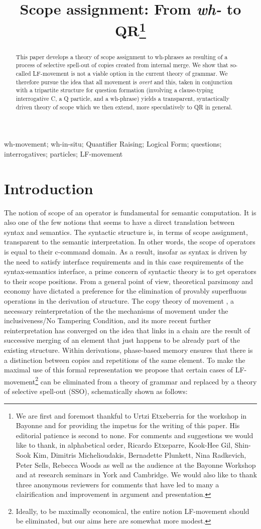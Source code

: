 \documentclass[charis]{glossa}
\title[Scope assignment]{Scope assignment: From \textit{wh-} to QR\thanks{We are first and foremost thankful to Urtzi Etxeberria for the workshop in Bayonne and for providing the impetus for the writing of this paper.  His editorial patience is second to none. For comments and suggestions we would like to thank, in alphabetical order, Ricardo Etxeparre, Kook-Hee Gil, Shin-Sook Kim, Dimitris Michelioudakis, Bernadette Plunkett, Nina Radkevich, Peter Sells, Rebecca Woods as well as the audience at the Bayonne Workshop and at research seminars in York and Cambridge.  We would also like to thank three anonymous reviewers for comments that have led to many a clairification and  improvement in argument and presentation. }}
\author[Tsoulas \& Yeo]%
{%
  \spauthor{George Tsoulas\\
  \institute{University of York}\\
  \small{Heslington, York YO10 5DD, UK\\
  george.tsoulas@york.ac.uk}
  }
  \AND
  \spauthor{Norman Yeo\\
  \institute{University of York}\\
  \small{Heslington, York YO10 5DD, UK\\
  norman.yeo@york.ac.uk}
  }%
}
\begin{document}
\sffamily
\maketitle

\begin{abstract}
This paper develops a theory of scope assignment to wh-phrases as resulting of a process of selective spell-out of copies created from internal merge.  We show that so-called LF-movement is not a viable option in the current theory of grammar.  We therefore pursue the idea that all movement is \textit{overt} and this, taken in conjunction with a tripartite structure for question formation (involving a clause-typing interrogative C, a Q particle, and a wh-phrase) yields a transparent, syntactically driven theory of scope which we then extend, more speculatively to QR in general.
\end{abstract}

\begin{keywords}

  wh-movement; wh-in-situ; Quantifier Raising; Logical Form; questions; interrogatives; particles; LF-movement

\end{keywords}


\rmfamily
\section{Introduction}
The notion of scope of an operator is fundamental for semantic computation. It is also one of the few notions that seems to have a direct translation between syntax and semantics. The syntactic structure is, in terms of scope assignment, transparent to the semantic interpretation.  In other words, the scope of operators is equal to their c-command domain.  As a result, insofar as syntax is driven by the need to satisfy interface requirements and in this case requirements of the syntax-semantics interface, a prime concern of syntactic theory is to get operators to their scope positions. From a general point of view, theoretical parsimony and economy have dictated a preference for the elimination of provably superfluous operations in the derivation of structure. The copy theory of movement \citep{chomsky:1993}, a necessary reinterpretation of the the mechanisms of movement under the inclusiveness/No Tampering Condition, and its more recent further reinterpretation has converged on the idea that links in a chain are the result of successive merging of an element that just happens to be already part of the existing structure. Within derivations, phase-based memory ensures that there is a distinction between copies and repetitions of the same element. To make the maximal use of this formal representation we propose that certain cases of LF-movement\footnote{Ideally, to be maximally economical, the entire notion LF-movement should be eliminated, but our aims here are somewhat more modest.} can be eliminated from a theory of grammar and replaced by a theory of selective spell-out (SSO), schematically shown as follows:
\end{document}
